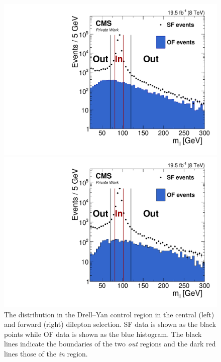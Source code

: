 \begin{figure}[htbp]
\centering
\begin{minipage}[t]{0.49\textwidth}
  \includegraphics[width=\textwidth]{plots/BG/rOutIn/rOutIn_SF_DrellYanControlCentral_Full2012.pdf}
\end{minipage}
\begin{minipage}[t]{0.49\textwidth}
\includegraphics[width=\textwidth]{plots/BG/rOutIn/rOutIn_SF_DrellYanControlForward_Full2012.pdf}
\end{minipage}

\caption{The \mll distribution in the Drell--Yan control region in the central (left) and forward (right) dilepton selection. SF data is shown as the black points while OF data is shown as the blue histogram. The black lines indicate the boundaries of the two \textit{out} regions and the dark red lines those of the \textit{in} region.}
\label{fig:rOutIn}
\end{figure} 
